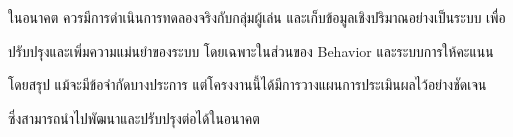 ในอนาคต ควรมีการดำเนินการทดลองจริงกับกลุ่มผู้เล่น และเก็บข้อมูลเชิงปริมาณอย่างเป็นระบบ เพื่อ
\par\vspace{0.5em}\noindent
ปรับปรุงและเพิ่มความแม่นยำของระบบ โดยเฉพาะในส่วนของ Behavior และระบบการให้คะแนน

\par\vspace{1em}\noindent
โดยสรุป แม้จะมีข้อจำกัดบางประการ แต่โครงงานนี้ได้มีการวางแผนการประเมินผลไว้อย่างชัดเจน 
\par\vspace{0.5em}\noindent
ซึ่งสามารถนำไปพัฒนาและปรับปรุงต่อได้ในอนาคต
